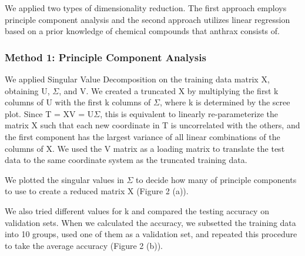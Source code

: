 \documentclass[12pt,onecolumn,letterpaper]{article}
\begin{document}
We applied two types of dimensionality reduction. The first approach employs principle component analysis and the second approach utilizes linear regression based on a prior knowledge of chemical compounds that anthrax consists of.  

\subsubsection{Method 1: Principle Component Analysis}

We applied Singular Value Decomposition on the training data matrix X, obtaining U, $\Sigma$, and V. We created a truncated X by multiplying the first k columns of U with the first k columns of $\Sigma$, where k is determined by the scree plot. Since T = XV = U$\Sigma$, this is equivalent to linearly re-parameterize the matrix X such that each new coordinate in T is uncorrelated with the others, and the first component has the largest variance of all linear combinations of the columns of X. We used the V matrix as a loading matrix to translate the test data to the same coordinate system as the truncated training data. 

We plotted the singular values in $\Sigma$ to decide how many of principle components to use to create a reduced matrix X (Figure 2 (a)). 

We also tried different values for k and compared the testing accuracy on validation sets. When we calculated the accuracy, we subsetted the training data into 10 groups, used one of them as a validation set, and repeated this procedure to take the average accuracy (Figure 2 (b)).
\end{document}
